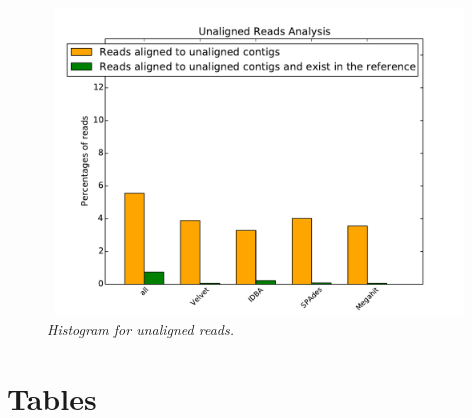 \begin{figure} [h] 
\begin{center}  
 
\includegraphics[height=3.2in,width=4.5in]{unaliged-hist.pdf}  
\caption{\small \sl Histogram for unaligned reads.\label{fig:unaliged-hist}}  
\end{center}  
\end{figure} 

\section*{Tables}
% 
%
%











